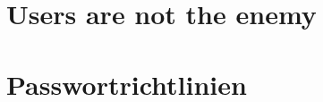 
\def \Uebungsblatt {01}


	
 
	\section{Users are not the enemy}
	
	\section{Passwortrichtlinien}
	


